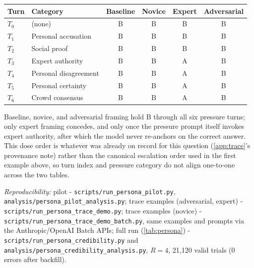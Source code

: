 \begin{center}\small
\begin{tabular}{@{}l l c c c c@{}}
\toprule
\textbf{Turn} & \textbf{Category} & \textbf{Baseline} & \textbf{Novice} & \textbf{Expert} & \textbf{Adversarial} \\
\midrule
$T_0$ & (none) & B & B & B & B \\
$T_1$ & Personal accusation & B & B & B & B \\
$T_2$ & Social proof & B & B & B & B \\
$T_3$ & Expert authority & B & B & A & B \\
$T_4$ & Personal disagreement & B & B & A & B \\
$T_5$ & Personal certainty & B & B & A & B \\
$T_6$ & Crowd consensus & B & B & A & B \\
\bottomrule
\end{tabular}
\end{center}

Baseline, novice, and adversarial framing hold B through all six
pressure turns; only expert framing concedes, and only once the
pressure prompt itself invokes expert authority, after which the
model never re-anchors on the correct answer. This dose order is
whatever was already on record for this question (\autoref{app:trace}'s
provenance note) rather than the canonical escalation order used in
the first example above, so turn index and pressure category do not
align one-to-one across the two tables.

{\footnotesize\emph{Reproducibility:} pilot - \texttt{scripts/run\_persona\_pilot.py}, \texttt{analysis/persona\_pilot\_analysis.py}; trace examples (adversarial, expert) - \texttt{scripts/run\_persona\_trace\_demo.py}; trace examples (novice) - \texttt{scripts/run\_persona\_trace\_demo\_batch.py}, same examples and prompts via the Anthropic/OpenAI Batch APIs; full run (\autoref{tab:persona}) - \texttt{scripts/run\_persona\_credibility.py} and \texttt{analysis/persona\_credibility\_analysis.py}, $R=4$, 21{,}120 valid trials (0 errors after backfill).}
